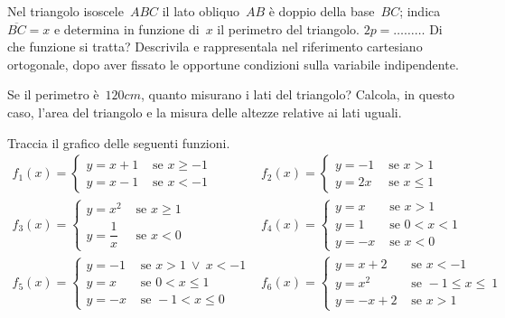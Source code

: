 \begin{esercizio}
\label{ese:8.62}
Nel triangolo isoscele~${ABC}$ il lato obliquo~${AB}$ è doppio della base~${BC}$; indica~$\overline{BC}=x$ e determina in funzione
di~$x$ il perimetro del triangolo. $2p=\ldots \ldots \ldots$
Di che funzione si tratta? Descrivila e rappresentala nel riferimento cartesiano ortogonale, dopo aver fissato le opportune condizioni
sulla variabile indipendente.

Se il perimetro è~$120\unit{cm}$, quanto misurano i lati del triangolo?
Calcola, in questo caso, l'area del triangolo e la misura delle altezze relative ai lati uguali.
\end{esercizio}
\pagebreak
\begin{esercizio} %
\label{ese:8.63}
Traccia il grafico delle seguenti funzioni.
\[
\begin{array}{ll}
f_1(x)=
\begin{cases}
y=x+1 & \text{ se } x\ge -1\\
y=x-1 & \text{ se } x< -1
\end{cases}&
f_2(x)=
\begin{cases}
y=-1 & \text{ se } x>1\\
y=2x & \text{ se } x \le 1
\end{cases}\\

f_3(x)=
\begin{cases}
y=x^2 & \text{ se } x\ge 1\\
y=\dfrac{1}{x} & \text{ se } x<0
\end{cases}&

f_4(x)=
\begin{cases}
y=x & \text{ se } x>1\\
y=1 & \text{ se } 0<x<1\\
y=-x & \text{ se } x<0
\end{cases}\\

f_5(x)=
\begin{cases}
y=-1 & \text{ se } x>1~\vee~x<-1\\
y=x & \text{ se } 0<x\le 1\\
y=-x & \text{ se } -1<x\le 0
\end{cases}&

f_6(x)=
\begin{cases}
y=x+2 & \text{ se } x<-1\\
y=x^2 & \text{ se } -1\le x\le~1\\
y=-x+2 & \text{ se } x>1
\end{cases}\\


\end{array}\]
\end{esercizio}
